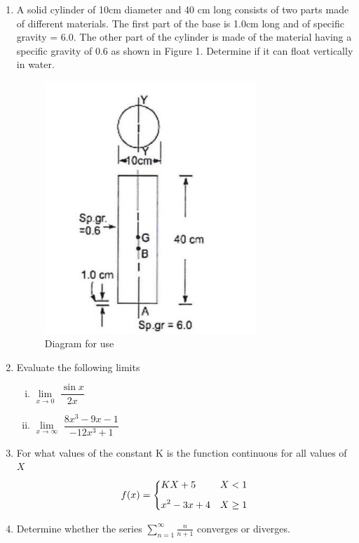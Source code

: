 \begin{enumerate}
	\item A solid cylinder of 10cm diameter and 40 cm long consists of two parts made of different materials. The first part of the base is 1.0cm long and of specific gravity = 6.0. The other part of the cylinder is made of the material having a specific gravity of 0.6 as shown in Figure 1. Determine if it can float vertically in water. 
	\begin{figure}[h!]
		\centering
		\label{figa1}
		\includegraphics[width=80mm]{fm.png}
		\caption{Diagram for use}
	\end{figure}
\newpage
\item Evaluate the following limits
\begin{enumerate}[(i)]
	\item $\lim\limits_{x\rightarrow 0}$ $\dfrac{\sin x}{2x}$ 
	\vspace{0.2cm}
	\item $\lim\limits_{x\rightarrow \infty}$ $\dfrac{8x^{3} - 9x -1}{-12x^{3}+1}$ 
\end{enumerate}
\item For what values of the constant K is the function continuous for all values of $X$
\begin{equation*}
	f(x) = 
	\begin{dcases}
		KX + 5 &  X < 1  \\[1ex]
		x^{2}-3x + 4 & X \geq 1 
	\end{dcases}
\end{equation*}
\item Determine whether the series $\displaystyle{\sum_{n=1}^{\infty}}\frac{n}{n+1}$ converges or diverges. 
\end{enumerate}